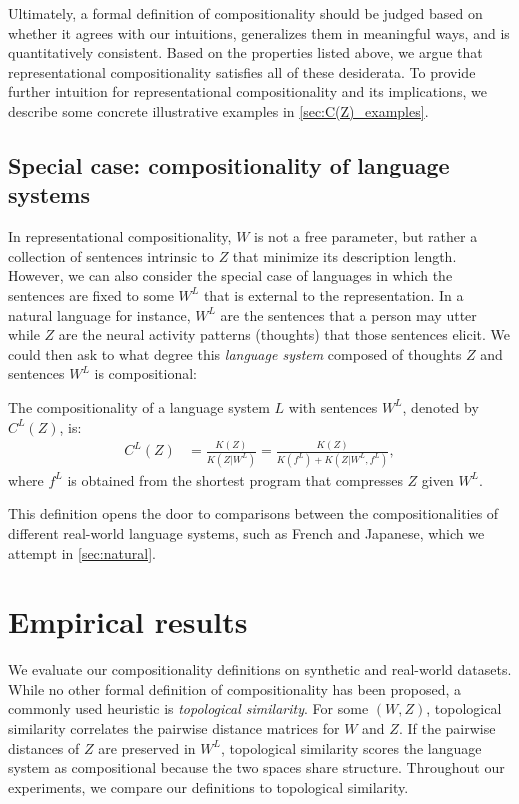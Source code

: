 \documentclass{article} %
\newcommand{\comp}{representational compositionality}
\begin{document}
Ultimately, a formal definition of compositionality should be judged based on whether it agrees with our intuitions, generalizes them in meaningful ways, and is quantitatively consistent. Based on the properties listed above, we argue that \comp{} satisfies all of these desiderata. To provide further intuition for \comp{} and its implications, we describe some concrete illustrative examples in \cref{sec:C(Z)_examples}.


\subsection{Special case: compositionality of language systems}
\label{sec:language_system}

In \comp{}, $W$ is not a free parameter, but rather a collection of sentences intrinsic to $Z$ that minimize its description length. However, we can also consider the special case of languages in which the sentences are fixed to some $W^L$ that is external to the representation. In a natural language for instance, $W^L$ are the sentences that a person may utter while $Z$ are the neural activity patterns (thoughts) that those sentences elicit. We could then ask to what degree this \textit{language system} composed of thoughts $Z$ and sentences $W^L$ is compositional:

\begin{definition}
    \label{def:language_compositionality}
    The compositionality of a language system $L$ with sentences $W^L$, denoted by $C^L(Z)$, is:
    \begin{align}
    \label{eq:C^L(Z)}
    C^L(Z) &= \frac{K(Z)}{K(Z|W^L)} = \frac{K(Z)}{K(f^L) + K(Z|W^L,f^L)} ,
    \end{align}
    where $f^L$ is obtained from the shortest program that compresses $Z$ given $W^L$.
\end{definition}

This definition opens the door to comparisons between the compositionalities of different real-world language systems, such as French and Japanese, which we attempt in \cref{sec:natural}.


\section{Empirical results}
\label{sec:experiments}

We evaluate our compositionality definitions on synthetic and real-world datasets. While no other formal definition of compositionality has been proposed, a commonly used heuristic is \textit{topological similarity}. For some $(W, Z)$, topological similarity correlates the pairwise distance matrices for $W$ and $Z$. If the pairwise distances of $Z$ are preserved in $W^L$, topological similarity scores the language system as compositional because the two spaces share structure. Throughout our experiments, we compare our definitions to topological similarity.
\end{document}
